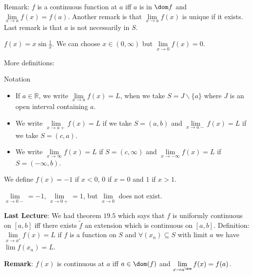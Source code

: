 \documentclass{report}
\begin{document}
Remark: $f$ is a continuous function at $a$ iff $a$ is in $\dom f$ and $\lim\limits_{x \to a} f(x) = f(a)$. Another remark is that $\lim\limits_{x \to a} f(x)$ is unique if it exists. Last remark is that $a$ is not necessarily in $S$.

\begin{examples}
    \begin{example}
        $f(x) = x \sin{\frac{1}{x}}$. We can choose $x \in (0, \infty)$ but $\lim\limits_{x \to 0} f(x) = 0$.
    \end{example}
\end{examples}

More definitions:

\begin{definition}{Notation}
    \begin{itemize}
        \item If $a \in \mathbb{R}$, we write $\lim\limits_{x \to a} f(x) = L$, when we take $S = J\backslash \{a\}$ where $J$ is an open interval containing $a$.

        \item We write $\lim\limits_{x \to a+}f(x) = L$ if we take $S = (a, b)$ and $\lim\limits_{x \to a-}f(x) = L$ if we take $S = (c, a)$.

        \item We write $\lim\limits_{x \to \infty}f(x) = L$ if $S = (c, \infty)$ and $\lim\limits_{x \to -\infty}f(x) = L$ if $S = (-\infty, b)$.
    \end{itemize}
\end{definition}

\begin{examples}
    \begin{example}
        We define $f(x) = -1$ if $x < 0$, $0$ if $x = 0$ and $1$ if $x > 1$.

        $\lim\limits_{x \to 0-}= -1$, $\lim\limits_{x \to 0+} = 1$, but $\lim\limits_{x \to 0}$ does not exist.
    \end{example}
\end{examples}

\textbf{Last Lecture}: We had theorem $19.5$ which says that $f$ is uniformly continuous on $[a, b]$ iff there exists $\tilde{f}$ an extension which is continuous on $[a, b]$. Definition: $\lim\limits_{x \to a^{s}}f(x) = L$   if $f$ is a function on $S$ and $\forall (x_{n}) \subseteq S$ with limit $a$ we have $\lim f(x_{n}) = L$. 

\textbf{Remark}: $f(x)$ is continuous at $a$ iff $a \in \dom (f)$ and $\lim\limits_{x \to a^{\dom}} f(x) = f(a)$. 
\end{document}
